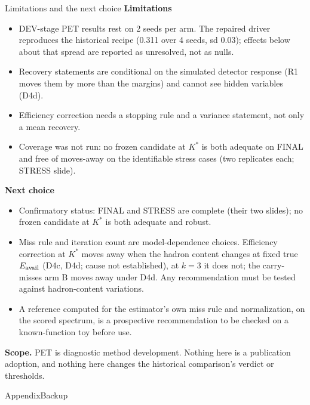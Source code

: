\documentclass[aspectratio=169,10pt]{beamer}
\def\evidencetext{}
\begin{document}
\gdef\evidencetext{\texttt{phase\_b/pet/results/summary.json}; \texttt{confirm/results/confirm\_results.json}}
\begin{frame}{Limitations and the next choice}
\textbf{Limitations}
\begin{itemize}\footnotesize
\item DEV-stage PET results rest on 2 seeds per arm. The repaired driver reproduces the historical recipe
(0.311 over 4 seeds, sd 0.03); effects below about that spread are
reported as unresolved, not as nulls.
\item Recovery statements are conditional on the simulated detector response (R1 moves them by more than the
margins) and cannot see hidden variables (D4d).
\item Efficiency correction needs a stopping rule and a variance statement, not only a mean recovery.
\item Coverage was not run: no frozen candidate at $K^*$ is both adequate on FINAL and free of moves-away on the identifiable stress cases (two replicates each; STRESS slide).
\end{itemize}
\textbf{Next choice}
\begin{itemize}\footnotesize
\item Confirmatory status: FINAL and STRESS are complete (their two slides); no frozen candidate at $K^*$ is both adequate and robust.
\item Miss rule and iteration count are model-dependence choices. Efficiency correction at $K^*$ moves away when the hadron content changes at fixed true $E_{\rm avail}$ (D4c, D4d; cause not established), at $k=3$ it does not; the carry-misses arm B moves away under D4d. Any recommendation must be tested against hadron-content variations.
\item A reference computed for the estimator's own miss rule and normalization, on the scored spectrum, is a
prospective recommendation to be checked on a known-function toy before use.
\end{itemize}
{\scriptsize \textbf{Scope.} PET is diagnostic method development. Nothing here is a publication adoption, and nothing here changes the historical comparison's verdict or thresholds.}
\end{frame}

\appendix
\gdef\evidencetext{}
\begin{frame}{Appendix}\centering\Large Backup\end{frame}
\end{document}
